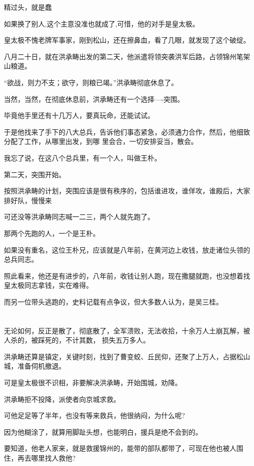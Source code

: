 \documentclass[11pt,a4paper,onecolumn]{article}
\begin{document}
精过头，就是蠢

如果换了别人,这个主意没准也就成了,可惜，他的对手是皇太极。

皇太极不愧老牌军事家，刚到松山，还在擦鼻血，看了几眼，就发现了这个破绽。

八月二十日，就在洪承畴出发的第二天，他派遣将领突袭洪军后路，占领锦州笔架山粮道。

``欲战，则力不支；欲守，则粮已竭。''洪承畴彻底休息了。

当然，当然，在彻底休息前，洪承畴还有一个选择----突围。

毕竟他手里还有十几万人，要真玩命，还能试试。

于是他找来了手下的八大总兵，告诉他们事态紧急，必须通力合作，然后，他细致分配了工作，从哪里出发，到哪
里会合，一切安排妥当，散会。

我忘了说，在这八个总兵里，有一个人，叫做王朴。

第二天，突围开始。

按照洪承畴的计划，突围应该是很有秩序的，包括谁进攻，谁佯攻，谁殿后，大家排好队，慢慢来

可还没等洪承畴同志喊一二三，两个人就先跑了。

那两个先跑的人，一个是王朴。

如果没有重名，这位王朴兄，应该就是八年前，在黄河边上收钱，放走诸位头领的总兵同志。

照此看来，他还是有进步的，八年前，收钱让别人跑，现在撒腿就跑，也没想着找皇太极同志拿钱，实在难得。

而另一位带头逃跑的，史料记载有点争议，但大多数人认为，是吴三桂。

\section[\thesection]{}

无论如何，反正是散了，彻底散了，全军溃败，无法收拾，十余万人土崩瓦解，被人杀的，被踩死的，不计其数，
损失五万多人。

洪承畴还算是镇定，关键时刻，找到了曹变蛟、丘民仰，还聚了上万人，占据松山城，准备伺机撤退。

可是皇太极很不识相，非要解决洪承畴，开始围城，劝降。

洪承畴拒不投降，派使者向京城求救。

可他足足等了半年，也没有等来救兵，他很纳闷，为什么呢?

因为他糊涂了，就算用脚趾头想，也能明白，援兵是绝不会到的。

要知道，他老人家来，就是救援锦州的，能带的部队都带了，可现在他也被人围住，再去哪里找人救他?
\end{document}
